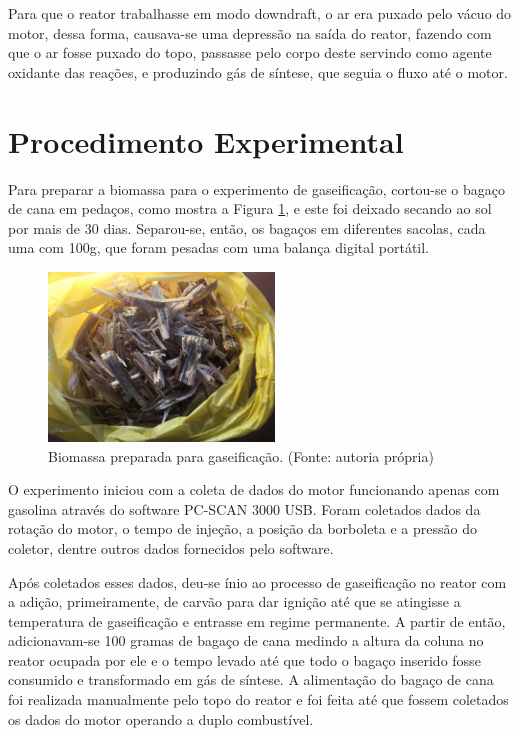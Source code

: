 Para que o reator trabalhasse em modo downdraft, o ar era puxado pelo vácuo do motor, dessa forma, causava-se uma depressão na saída do reator, fazendo com que o ar fosse puxado do topo, passasse pelo corpo deste servindo como agente oxidante das reações, e produzindo gás de síntese, que seguia o fluxo até o motor.

\section{Procedimento Experimental}

Para preparar a biomassa para o experimento de gaseificação, cortou-se o bagaço de cana em pedaços, como mostra a Figura \ref{bagaco_cortado}, e este foi deixado secando ao sol por mais de 30 dias. Separou-se, então, os bagaços em diferentes sacolas, cada uma com 100g, que foram pesadas com uma balança digital portátil.

\begin{figure}[!htb]
	\centering
	\includegraphics[width=6cm]{Figuras/bagaco_cortado}
	\caption{Biomassa preparada para gaseificação. (Fonte: autoria própria)}
	\label{bagaco_cortado}
\end{figure}

O experimento iniciou com a coleta de dados do motor funcionando apenas com gasolina através do software PC-SCAN 3000 USB. Foram coletados dados da rotação do motor, o tempo de injeção, a posição da borboleta e a pressão do coletor, dentre outros dados fornecidos pelo software.

Após coletados esses dados, deu-se ínio ao processo de gaseificação no reator com a adição, primeiramente, de carvão para dar ignição até que se atingisse a temperatura de gaseificação e entrasse em regime permanente.
A partir de então, adicionavam-se 100 gramas de bagaço de cana medindo a altura da coluna no reator ocupada por ele e o tempo levado até que todo o bagaço inserido fosse consumido e transformado em gás de síntese. A alimentação do bagaço de cana foi realizada manualmente pelo topo do reator e foi feita até que fossem coletados os dados do motor operando a duplo combustível.

